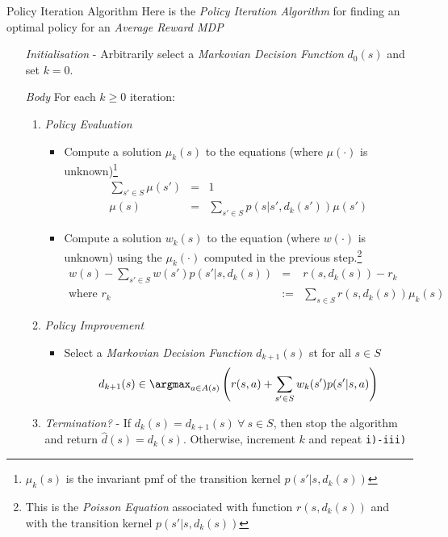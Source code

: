 \documentclass[11pt,a4paper]{article}
\begin{document}
  \begin{definition}{Policy Iteration Algorithm}
    Here is the \textit{Policy Iteration Algorithm} for finding an optimal policy for an \textit{Average Reward MDP}
    \begin{itemize}
      \item[\textit{Initialisation}] - Arbitrarily select a \textit{Markovian Decision Function} $d_0(s)$ and set $k=0$.
      \item[\textit{Body}] For each $k\geq0$ iteration:
      \begin{enumerate}
        \item \textit{Policy Evaluation}
        \begin{itemize}
          \item Compute a solution $\mu_k(s)$ to the equations (where $\mu(\cdot)$ is unknown)\footnote{$\mu_k(s)$ is the invariant pmf of the transition kernel $p(s'|s,d_k(s))$}
          \[\begin{array}{rcl}
            \sum_{s'\in S}\mu(s')&=&1\\
            \mu(s)&=&\sum_{s'\in S}p(s|s',d_k(s'))\mu(s')
          \end{array}\]
          \item Compute a solution $w_k(s)$ to the equation (where $w(\cdot)$ is unknown) using the $\mu_k(\cdot)$ computed in the previous step.\footnote{This is the \textit{Poisson Equation} associated with function $r(s,d_k(s))$ and with the transition kernel $p(s'|s,d_k(s))$}
          \[\begin{array}{rrl}
            w(s)-\sum_{s'\in S}w(s')p(s'|s,d_k(s))&=&r(s,d_k(s))-r_k\\
            \text{where }r_k&:=&\sum_{s\in S}r(s,d_k(s))\mu_k(s)
          \end{array}\]
        \end{itemize}
        \item \textit{Policy Improvement}
        \begin{itemize}
          \item Select a \textit{Markovian Decision Function} $d_{k+1}(s)$ st for all $s\in S$
          \[ d_{k+1}(s)\in\argmax_{a\in A(s)}\left(r(s,a)+\sum_{s'\in S}w_k(s')p(s'|s,a)\right) \]
        \end{itemize}
        \item \textit{Termination?} - If $d_k(s)=d_{k+1}(s)\ \forall\ s\in S$, then stop the algorithm and return $\hat{d}(s)=d_k(s)$. Otherwise, increment $k$ and repeat \texttt{i)-iii)}
      \end{enumerate}
    \end{itemize}
  \end{definition}
\end{document}
